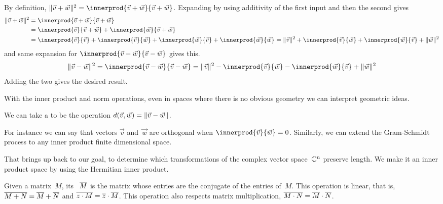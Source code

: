 By definition,
$
  \norm{\vec{v}+\vec{w}}^2=\innerprod{\vec{v}+\vec{w}}{\vec{v}+\vec{w}}
$.
Expanding by using additivity of the first input and then the second gives 
\begin{align*}
  \norm{\vec{v}+\vec{w}}^2
  &=\innerprod{\vec{v}+\vec{w}}{\vec{v}+\vec{w}}           \\
  &=\innerprod{\vec{v}}{\vec{v}+\vec{w}}+\innerprod{\vec{w}}{\vec{v}+\vec{w}} \\
  &=\innerprod{\vec{v}}{\vec{v}}            
   +\innerprod{\vec{v}}{\vec{w}}
   +\innerprod{\vec{w}}{\vec{v}}
   +\innerprod{\vec{w}}{\vec{w}}
  =\norm{\vec{v}}^2            
   +\innerprod{\vec{v}}{\vec{w}}
   +\innerprod{\vec{w}}{\vec{v}}
   +\norm{\vec{w}}^2
\end{align*}
and same expansion for $\innerprod{\vec{v}-\vec{w}}{\vec{v}-\vec{w}}$
gives this.
\begin{equation*}
  \norm{\vec{v}-\vec{w}}^2
  =\innerprod{\vec{v}-\vec{w}}{\vec{v}-\vec{w}}
  =\norm{\vec{v}}^2
   -\innerprod{\vec{v}}{\vec{w}}
   -\innerprod{\vec{w}}{\vec{v}}
   +\norm{\vec{w}}^2
\end{equation*}
Adding the two gives the desired result. 






With the inner product and norm operations, 
even in spaces where there is no obvious geometry
we can interpret geometric ideas. 

We can take a  to be the operation
$d(\vec{v},\vec{w})=\lVert\vec{v}-\vec{w}\rVert$.








For instance we can say that
vectors $\vec{v}$ and~$\vec{w}$ are orthogonal when 
$\innerprod{\vec{v}}{\vec{w}}=0$.
Similarly, we can extend the Gram-Schmidt process
to any inner product finite dimensional space.

That brings up back to our goal, to determine which transformations
of the complex vector space~$\mathbb{C}^n$ preserve length.
We make it an inner product space by using the Hermitian inner product.

Given a matrix~$M$, its ~$\overline{M}$ is 
the matrix whose entries are the conjugate of the entries of~$M$.
This operation is linear, that is, 
$\overline{M+N}=\overline{M}+\overline{N}$ and 
$\overline{z\cdot M}=\overline{z}\cdot\overline{M}$.
This operation also respects matrix multiplication, 
$\overline{M\cdot N}=\overline{M}\cdot\overline{N}$.  

